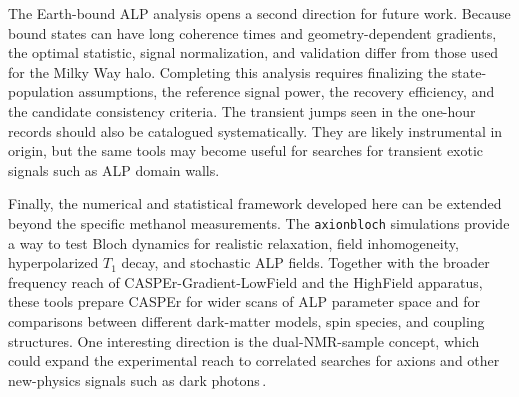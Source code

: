 

The Earth-bound ALP analysis opens a second direction for future work.
Because bound states can have long coherence times and geometry-dependent gradients, the optimal statistic, signal normalization, and validation differ from those used for the Milky Way halo.
Completing this analysis requires finalizing the state-population assumptions, the reference signal power, the recovery efficiency, and the candidate consistency criteria.
The transient jumps seen in the one-hour records should also be catalogued systematically.
They are likely instrumental in origin, but the same tools may become useful for searches for transient exotic signals such as ALP domain walls.

Finally, the numerical and statistical framework developed here can be extended beyond the specific methanol measurements.
The \texttt{axionbloch} simulations provide a way to test Bloch dynamics for realistic relaxation, field inhomogeneity, hyperpolarized $T_1$ decay, and stochastic ALP fields.
Together with the broader frequency reach of CASPEr-Gradient-LowField and the HighField apparatus, these tools prepare CASPEr for wider scans of ALP parameter space and for comparisons between different dark-matter models, spin species, and coupling structures.
One interesting direction is the dual-NMR-sample concept, which could expand the experimental reach to correlated searches for axions and other new-physics signals such as dark photons\,\cite{dror2025_axiondualNMR}.
\par\endgroup
